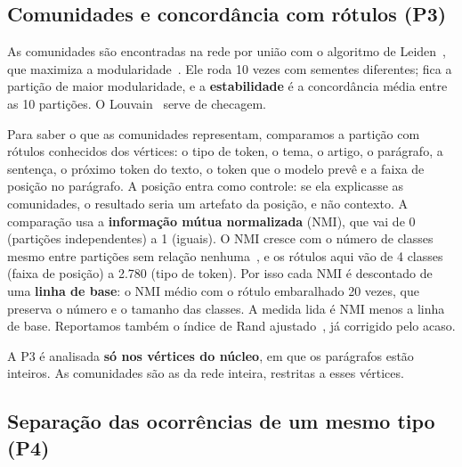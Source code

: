 \subsection{Comunidades e concordância com rótulos (P3)}\label{sec:met-comunidades}

As comunidades são encontradas na rede por união com o algoritmo de
Leiden~\cite{traag2019}, que maximiza a modularidade~\cite{newman2006}. Ele roda 10 vezes
com sementes diferentes; fica a partição de maior modularidade, e a \textbf{estabilidade} é a
concordância média entre as 10 partições. O Louvain~\cite{blondel2008} serve de checagem.

Para saber o que as comunidades representam, comparamos a partição com rótulos conhecidos dos
vértices: o tipo de token, o tema, o artigo, o parágrafo, a sentença, o próximo token do texto,
o token que o modelo prevê e a faixa de posição no parágrafo. A posição entra como controle:
se ela explicasse as comunidades, o resultado seria um artefato da posição, e não contexto. A
comparação usa a \textbf{informação mútua normalizada} (NMI), que vai de 0 (partições
independentes) a 1 (iguais). O NMI cresce com o número de classes mesmo entre partições sem
relação nenhuma~\cite{vinh2010}, e os rótulos aqui vão de 4 classes (faixa de posição) a 2.780
(tipo de token). Por isso cada NMI é descontado de uma \textbf{linha de base}: o NMI médio
com o rótulo embaralhado 20 vezes, que preserva o número e o tamanho das classes. A medida
lida é NMI menos a linha de base. Reportamos também o índice de Rand
ajustado~\cite{hubert1985}, já corrigido pelo acaso.

A P3 é analisada \textbf{só nos \nVerticesNucleo{} vértices do núcleo}, em que os parágrafos
estão inteiros. As comunidades são as da rede inteira, restritas a esses vértices.

\subsection{Separação das ocorrências de um mesmo tipo (P4)}\label{sec:met-p4}


